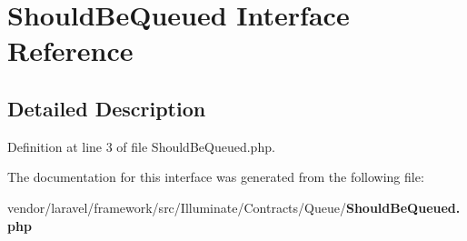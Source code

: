 \section{Should\+Be\+Queued Interface Reference}
\label{interface_illuminate_1_1_contracts_1_1_queue_1_1_should_be_queued}


\subsection{Detailed Description}


Definition at line 3 of file Should\+Be\+Queued.\+php.



The documentation for this interface was generated from the following file\+:\begin{DoxyCompactItemize}
\item 
vendor/laravel/framework/src/\+Illuminate/\+Contracts/\+Queue/{\bf Should\+Be\+Queued.\+php}\end{DoxyCompactItemize}
